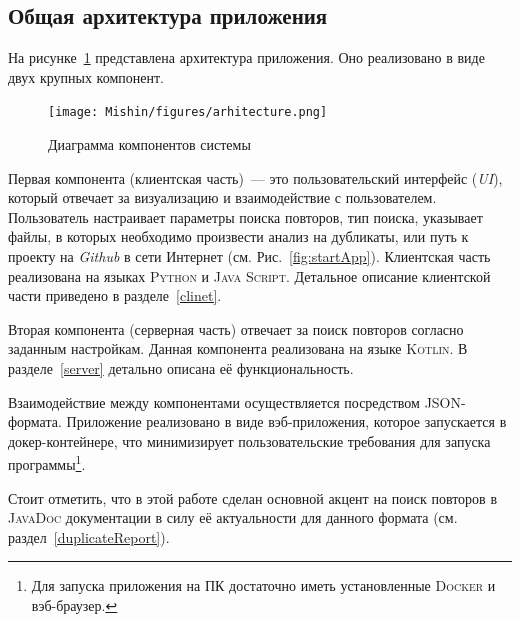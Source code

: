 

\subsection{Общая архитектура приложения}
На рисунке~\ref{fig:application} представлена архитектура приложения.
Оно реализовано в виде двух крупных компонент.

\begin{figure}[H]
    \texttt{[image: Mishin/figures/arhitecture.png]}
    \caption{Диаграмма компонентов системы}\label{fig:application}
\end{figure}


Первая компонента (клиентская часть)~--- это пользовательский интерфейс (\emph{UI}), который отвечает за визуализацию и взаимодействие с пользователем.
Пользователь настраивает параметры поиска повторов, тип поиска, указывает файлы, в которых необходимо произвести анализ на дубликаты, или путь к проекту на \emph{Github} в сети Интернет (см. Рис.~\ref{fig:startApp}).
Клиентская часть реализована на языках \textsc{Python} и \textsc{Java Script}.
Детальное описание клиентской части приведено в разделе~\ref{clinet}.

Вторая компонента (серверная часть) отвечает за поиск повторов согласно заданным настройкам.
Данная компонента реализована на языке \textsc{Kotlin}.
В разделе~\ref{server} детально описана её функциональность.

Взаимодействие между компонентами осуществляется посредством \textsc{JSON}-формата.
Приложение реализовано в виде вэб-приложения, которое запускается в докер-контейнере, что минимизирует пользовательские требования для запуска программы\footnote{Для запуска приложения на ПК достаточно иметь установленные \textsc{Docker} и вэб-браузер.}.

Стоит отметить, что в этой работе сделан основной акцент на поиск повторов в \textsc{JavaDoc} документации в силу её актуальности для данного формата (см. раздел~\ref{duplicateReport}).


